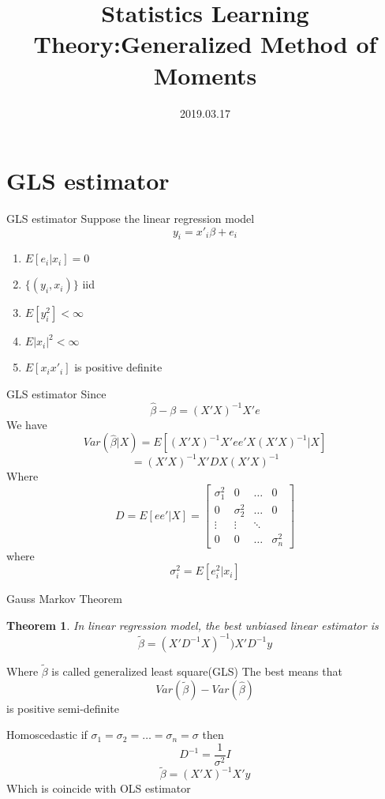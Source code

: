 \documentclass{beamer}
\title[Introduction]{Statistics Learning Theory:Generalized Method of Moments}
\author{}
\institute{}
\date{2019.03.17}
\newtheorem{thm}{Theorem}[subsection]
\begin{document}
\begin{frame}
  \titlepage
\end{frame}

\section{GLS estimator}
\begin{frame}{GLS estimator}
	Suppose the linear regression model
	\[y_i = x'_i \beta + e_i \]
	\begin{enumerate}
	\item $E[e_i|x_i]=0$
	\item $\{(y_i,x_i)\}$ iid
	\item $E[y^2_i]	< \infty$
	\item $E|x_i|^2 < \infty$
	\item $E[x_i x'_i] $ is positive definite
	\end{enumerate}
\end{frame}
\begin{frame}{GLS estimator}
Since 
\[\hat{\beta} - \beta = (X'X)^{-1}X'e\]
We have
\[Var(\hat{\beta}|X) = E[(X'X)^{-1}X'ee'X(X'X)^{-1}|X]\]
\[= (X'X)^{-1} X'DX(X'X)^{-1}\]
Where
\[D = E[ee'|X] = \begin{bmatrix}
				\sigma^2_{1} & 0 & \dots & 0 \\
				0 & \sigma^2_{2} & \dots & 0 \\
				\vdots & \vdots & \ddots  \\ 
				0 & 0 & \dots & \sigma^2_n
\end{bmatrix}\]
where
\[\sigma^2_i =  E[e^2_i|x_i]\]
\end{frame}
\begin{frame}{Gauss Markov Theorem}
	\begin{thm}
		In linear regression model, the best unbiased linear estimator is
	\[\tilde{\beta} = (X'D^{-1}X)^{-1} )X'D^{-1}y\]
	\end{thm}
	Where $\tilde{\beta}$ is called generalized least square(GLS)
	The best means that 
	\[Var(\tilde{\beta}) - Var(\hat{\beta})\]
	is positive semi-definite
\end{frame}
\begin{frame}{Homoscedastic}
	if $\sigma_1 = \sigma_2 =  \dots = \sigma_n  = \sigma$
	then 
	\[D^{-1} = \frac{1}{\sigma^2} I \]
	\[\tilde{\beta} = (X'X)^{-1} X' y\]
	Which is coincide with OLS estimator
\end{frame}
\end{document}
